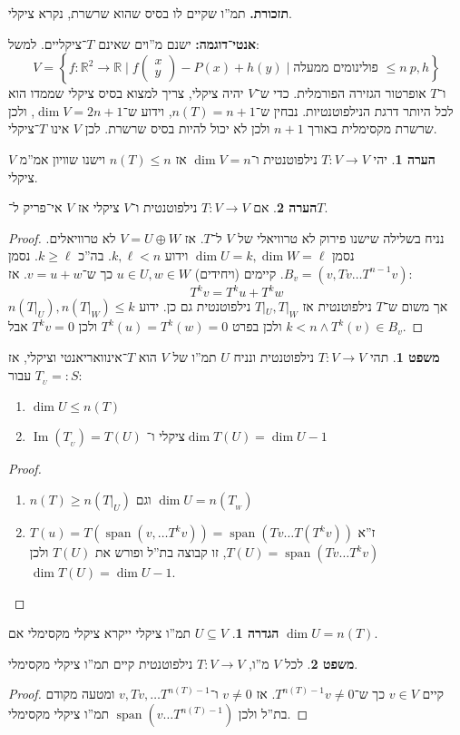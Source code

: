 \documentclass[a4paper]{article}
\newcommand\envendproof{\vspace{-16pt}}
\newcommand\R     {\mathbb{R}}
\newcommand\ml    {\ell}
\DeclareMathOperator\Img   {Im}
\DeclareMathOperator{\Sp}      {span}
\newcommand\co        {\colon}
\newcommand\pms[1]    {\begin{pmatrix}
		#1
\end{pmatrix}}
\newcommand\ccb[1]    {\left \{ #1 \right \}}
\theoremstyle{definition}
\newtheorem{Theorem}{\color{myblue}משפט}
\newtheorem{Definition}{\color{mygreen}הגדרה}
\newtheorem{Remark}{\color{mycyan}הערה}
\newcommand\theo  [1] {\begin{Theorem}#1\end{Theorem}}
\newcommand\defi  [1] {\begin{Definition}#1\end{Definition}}
\newcommand\rmark [1] {\begin{Remark}#1\end{Remark}}
\begin{document}
	\textbf{תזכורת. }תמ''ו שקיים לו בסיס שהוא שרשרת, נקרא ציקלי. 
	
	\textbf{אנטי־דוגמה: }ישנם מ''וים שאינם $T$־ציקליים. למשל: 
	\[ V = \ccb{f \co \R^2 \to \R \mid f\pms{x \\ y} - P(x) + h(y) \mid \text{פולינומים ממעלה $\le n$} \ p, h} \]
	ו־$T$ אופרטור הגזירה הפורמלית. 
	כדי ש־$V$ יהיה ציקלי, צריך למצוא בסיס ציקלי שממדו הוא לכל היותר דרגת הנילפוטנטיות. נבחין ש־$n(T) = n  + 1$, וידוע ש־$\dim V = 2n + 1$, ולכן שרשרת מקסימלית באורך $n + 1$ ולכן לא יכול להיות בסיס שרשרת. לכן $V$ אינו $T$־ציקלי. 
	
	\rmark{יהי $T \co V \to V$ נילפוטנטית ו־$\dim V = n$ אז $n(T) \le n$ וישנו שוויון אמ''מ $V$ ציקלי. }
	
	\rmark{אם $T \co V \to V$ נילפוטנטית ו־$V$ ציקלי אז $V$ אי־פריק ל־$T$. }
	\begin{proof}
		נניח בשלילה שישנו פירוק לא טרוויאלי של $V$ ל־$T$. אז $V = U \oplus W$ לא טרוויאלים. נסמן $\dim U = k, \dim W = \ml$ וידוע $k, \ml < n$. בה''כ $k \ge \ml$. נסמן $B_v = (v, Tv \dots T^{n - 1}v)$. קיימים (ויחידים) $u \in U, w \in W$ כך ש־$v = u + w$. אז: 
		\[ T^{k}v = T^ku + T^kw \]
		אך משום ש־$T$ נילפוטנטית אז $T|_{U}, T|_{W}$ נילפוטנטית גם כן. ידוע $n(T|_{U}), n(T|_{W}) \le k$ ולכן בפרט $T^{k}(u) = T^{k}(w) = 0$ ולכן $T^{k}v = 0$ אבל $k < n \land T^k(v) \in B_v$. 
	\end{proof}
	
	\theo{תהי $T \co V \to V$ נילפוטנטית ונניח $U$ תמ''ו של $V$ הוא $T$־אינוואריאנטי וציקלי, אז עבור $T_{_U} =: S$: 
		\begin{enumerate}
			\item $\dim U \le n(T)$
			\item $\Img(T_{_U}) = T(U)$ ציקלי ו־$\dim T(U) = \dim U - 1$
	\end{enumerate}}
	\begin{proof}\,
		\begin{enumerate}
			\item $n(T) \ge n(T|_{U})$ וגם $\dim U = n(T_{_W})$
			\item $T(u) = T(\Sp(v, \dots T^{k}v)) = \Sp (Tv \dots T(T^k v))$ ז''א $T(U) = \Sp(Tv \dots T^k v)$, זו קבוצה בת''ל ופורש את $T(U)$ ולכן $\dim T(U) = \dim U - 1$. 
		\end{enumerate}\envendproof
	\end{proof}
	
	\defi{$U \subseteq V$ תמ''ו ציקלי ייקרא ציקלי מקסימלי אם $\dim U = n(T)$. }
	\theo{לכל $V$ מ''ו, $T \co V \to V$ נילפוטנטית קיים תמ''ו ציקלי מקסימלי. }
	\begin{proof}
		קיים $v \in V$ כך ש־$T^{n(T) - 1}v \neq 0$. אז $v \neq 0$ ו־$v, Tv, \dots T^{n(T) - 1}$ ומטעה מקודם בת''ל ולכן $\Sp(v \dots T^{n(T) -1})$ תמ''ו ציקלי מקסימלי. 
	\end{proof}
	
\end{document}
